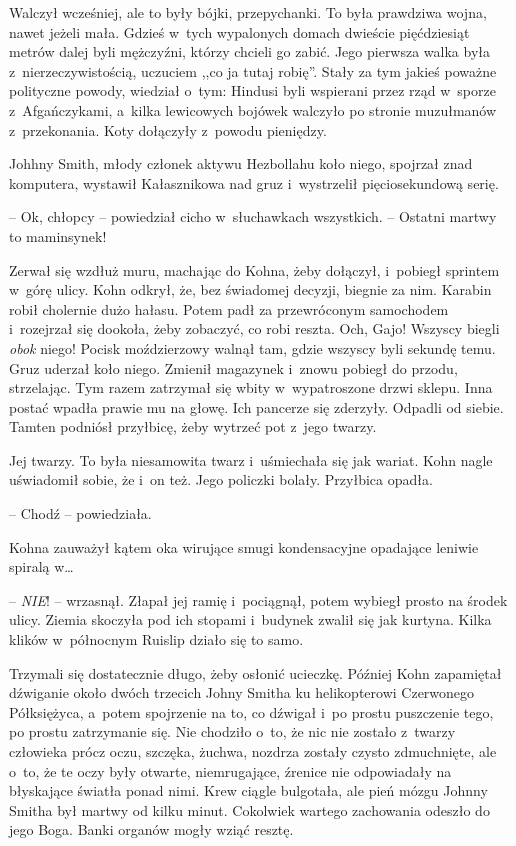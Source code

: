 \documentclass[oneside,polish,11pt,sfheadings]{mwbk}
\begin{document}
Walczył wcześniej, ale to były bójki, przepychanki. To była prawdziwa
wojna, nawet jeżeli mała. Gdzieś w~tych wypalonych domach dwieście
pięćdziesiąt metrów dalej byli mężczyźni, którzy chcieli go zabić. Jego
pierwsza walka była z~nierzeczywistością, uczuciem ,,co ja tutaj robię''.
Stały za tym jakieś poważne polityczne powody, wiedział o~tym: Hindusi
byli wspierani przez rząd w~sporze z~Afgańczykami, a~kilka lewicowych
bojówek walczyło po stronie muzułmanów z~przekonania. Koty dołączyły z~powodu pieniędzy.

Johhny Smith, młody członek aktywu Hezbollahu koło niego, spojrzał znad
komputera, wystawił Kałasznikowa nad gruz i~wystrzelił pięciosekundową
serię.

-- Ok, chłopcy -- powiedział cicho w~słuchawkach wszystkich. -- Ostatni
martwy to maminsynek!

Zerwał się wzdłuż muru, machając do Kohna, żeby dołączył, i~pobiegł
sprintem w~górę ulicy. Kohn odkrył, że, bez świadomej decyzji, biegnie
za nim. Karabin robił cholernie dużo hałasu. Potem padł za przewróconym
samochodem i~rozejrzał się dookoła, żeby zobaczyć, co robi reszta. Och,
Gajo! Wszyscy biegli \emph{obok} niego! Pocisk moździerzowy walnął tam,
gdzie wszyscy byli sekundę temu. Gruz uderzał koło niego. Zmienił
magazynek i~znowu pobiegł do przodu, strzelając. Tym razem zatrzymał się
wbity w~wypatroszone drzwi sklepu. Inna postać wpadła prawie mu na
głowę. Ich pancerze się zderzyły. Odpadli od siebie. Tamten podniósł
przyłbicę, żeby wytrzeć pot z~jego twarzy.

Jej twarzy. To była niesamowita twarz i~uśmiechała się jak wariat. Kohn
nagle uświadomił sobie, że i~on też. Jego policzki bolały. Przyłbica
opadła.

-- Chodź -- powiedziała.

Kohna zauważył kątem oka wirujące smugi kondensacyjne opadające leniwie
spiralą w\ldots

-- \emph{NIE}! -- wrzasnął. Złapał jej ramię i~pociągnął, potem wybiegł
prosto na środek ulicy. Ziemia skoczyła pod ich stopami i~budynek zwalił
się jak kurtyna. Kilka klików w~północnym Ruislip działo się to samo.

Trzymali się dostatecznie długo, żeby osłonić ucieczkę. Później Kohn
zapamiętał dźwiganie około dwóch trzecich Johny Smitha ku helikopterowi
Czerwonego Półksiężyca, a~potem spojrzenie na to, co dźwigał i~po prostu
puszczenie tego, po prostu zatrzymanie się. Nie chodziło o~to, że nic
nie zostało z~twarzy człowieka prócz oczu, szczęka, żuchwa, nozdrza
zostały czysto zdmuchnięte, ale o~to, że te oczy były otwarte,
niemrugające, źrenice nie odpowiadały na błyskające światła ponad nimi.
Krew ciągle bulgotała, ale pień mózgu Johnny Smitha był martwy od kilku
minut. Cokolwiek wartego zachowania odeszło do jego Boga. Banki organów
mogły wziąć resztę.
\end{document}
